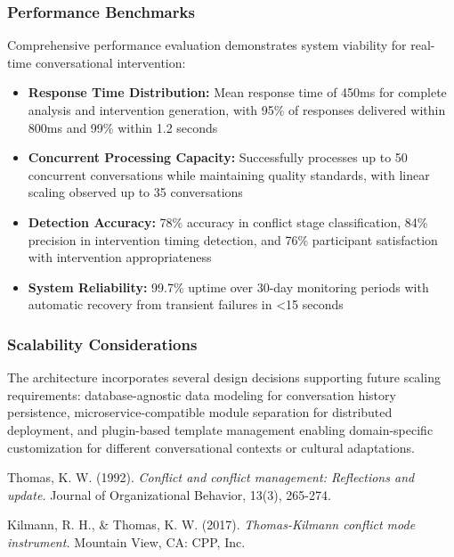 \documentclass[12pt,a4paper]{article}
\begin{document}
\subsubsection{Performance Benchmarks}
Comprehensive performance evaluation demonstrates system viability for real-time conversational intervention:

\begin{itemize}
\item \textbf{Response Time Distribution:} Mean response time of 450ms for complete analysis and intervention generation, with 95\% of responses delivered within 800ms and 99\% within 1.2 seconds
\item \textbf{Concurrent Processing Capacity:} Successfully processes up to 50 concurrent conversations while maintaining quality standards, with linear scaling observed up to 35 conversations
\item \textbf{Detection Accuracy:} 78\% accuracy in conflict stage classification, 84\% precision in intervention timing detection, and 76\% participant satisfaction with intervention appropriateness
\item \textbf{System Reliability:} 99.7\% uptime over 30-day monitoring periods with automatic recovery from transient failures in <15 seconds
\end{itemize}

\subsubsection{Scalability Considerations}
The architecture incorporates several design decisions supporting future scaling requirements: database-agnostic data modeling for conversation history persistence, microservice-compatible module separation for distributed deployment, and plugin-based template management enabling domain-specific customization for different conversational contexts or cultural adaptations.

\begin{thebibliography}{9}
Thomas, K. W. (1992).
\textit{Conflict and conflict management: Reflections and update.}
Journal of Organizational Behavior, 13(3), 265-274.

Kilmann, R. H., \& Thomas, K. W. (2017).
\textit{Thomas-Kilmann conflict mode instrument.}
Mountain View, CA: CPP, Inc.
\end{thebibliography}
\end{document}
